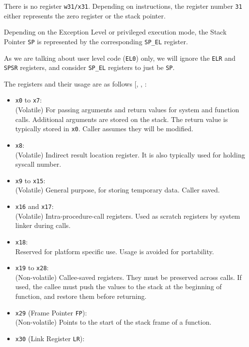\documentclass[a4paper, nobind]{templates/ociamthesis}
\providecommand{\tightlist}{%
  \setlength{\itemsep}{0pt}\setlength{\parskip}{0pt}}
\begin{document}
There is no register \texttt{w31/x31}. Depending on instructions, the register number \texttt{31}
either represents the zero register or the stack pointer.

Depending on the Exception Level or privileged execution mode,
the Stack Pointer \texttt{SP} is represented by the corresponding \texttt{SP\_EL} register.

As we are talking about user level code (\texttt{EL0}) only, we will ignore the \texttt{ELR} and \texttt{SPSR}
registers, and consider \texttt{SP\_EL} registers to just be \texttt{SP}.

The registers and their usage are as follows {[}, , \citeproc{ref-arm-pcs}{12}{]}:

\begin{itemize}
\tightlist
\item
  \texttt{x0} to \texttt{x7}:\\
  (Volatile) For passing arguments and return values for system and function calls.
  Additional arguments are stored on the stack.
  The return value is typically stored in \texttt{x0}. Caller assumes they will be modified.
\item
  \texttt{x8}:\\
  (Volatile) Indirect result location register. It is also typically used for holding
  syscall number.
\item
  \texttt{x9} to \texttt{x15}:\\
  (Volatile) General purpose, for storing temporary data. Caller saved.
\item
  \texttt{x16} and \texttt{x17}:\\
  (Volatile) Intra-procedure-call registers. Used as scratch
  registers by system linker during calls.
\item
  \texttt{x18}:\\
  Reserved for platform specific use. Usage is avoided for portability.
\item
  \texttt{x19} to \texttt{x28}:\\
  (Non-volatile) Callee-saved registers. They must be preserved across calls.
  If used, the callee must push the values to the stack at the beginning of function,
  and restore them before returning.
\item
  \texttt{x29} (Frame Pointer \texttt{FP}):\\
  (Non-volatile) Points to the start of the stack frame of a function.
\item
  \texttt{x30} (Link Register \texttt{LR}):\\

\end{itemize}
\end{document}
